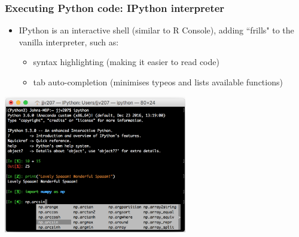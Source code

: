\documentclass[pdf]{beamer}
\begin{document}
\begin{frame}[fragile]
\frametitle{Executing Python code: IPython interpreter}
\begin{itemize}
	\item IPython is an interactive shell (similar to R Console), adding ``frills" to the vanilla interpreter, such as:

	\begin{itemize}
		\item syntax highlighting (making it easier to read code)
		\item tab auto-completion (minimises typeos and lists available functions)  
	\end{itemize}
\end{itemize}

\begin{center}
\includegraphics[width=0.6\textwidth]{ipython.png}
\end{center}
\end{frame}
\end{document}
